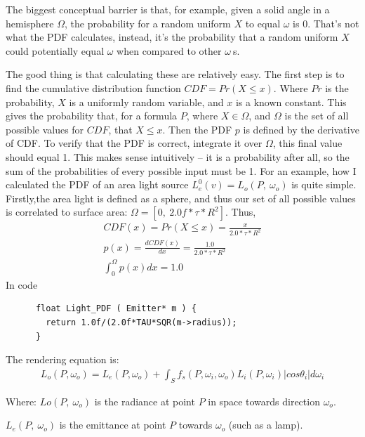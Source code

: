 \documentclass{article}
\begin{document}
    The
    biggest conceptual barrier is that, for example, given a solid angle in a hemisphere $\Omega$, the probability for a random uniform $X$ to equal $\omega$ is 0. That's not what the PDF calculates, instead, it's the
    probability that a random uniform $X$ could potentially equal $\omega$ when compared to other $\omega\:$s.
    

    The good thing is that calculating these are relatively easy. The first step is to
    find the cumulative distribution function $CDF = Pr(X \leq x)$. Where $Pr$
    is the probability, $X$ is a uniformly random variable, and $x$ is a known
    constant. This gives the probability that, for a formula
    $P$, where $X \in \Omega$, and $\Omega$ is the set of all possible values
    for $CDF$,
    that $X \leq x$. Then the PDF $p$ is defined by the derivative of CDF. To verify that the PDF is correct, integrate it
    over $\Omega$, this final value should equal 1. This makes sense intuitively
    -- it is a probability after all, so the sum of the probabilities of every
    possible input must be 1.
    For an example, how I calculated the PDF of an area light source
      $L^0_e(v) = L_o(P,\:\omega_o)$ 
    is quite simple. Firstly,the area light is defined as a sphere, and thus our
    set of all possible values is correlated to surface area:
    $\Omega = [0,\:2.0f*\tau*R^2]$. Thus,
    \begin{align}
      CDF(x) = Pr(X \leq x) = \frac{x}{2.0*\tau*R^2}\\
      p(x) = \frac{dCDF(x)}{dx} = \frac{1.0}{2.0*\tau*R^2}\\
      \int_0^{\Omega}p(x)dx = 1.0
    \end{align}
    In code
    \begin{lstlisting}
      float Light_PDF ( Emitter* m ) {
        return 1.0f/(2.0f*TAU*SQR(m->radius));
      }
    \end{lstlisting}
    
    
  
  The rendering equation is:
  \begin{align}
    L_o(P, \omega_o) = L_e(P, \omega_o) + \int_{S}f_s(P, \omega_i,
    \omega_o) L_i(P, \omega_i) \vert cos\theta_i\vert d\omega_i
  \end{align}
  
  Where:
  	 $Lo(P,\:\omega_o)$ is the radiance at point $P$ in space towards direction $\omega_o$. 
  	 
  	 $L_e(P,\:\omega_o)$ is the emittance at point $P$ towards $\omega_o$ (such as a lamp).
  	 
\end{document}
